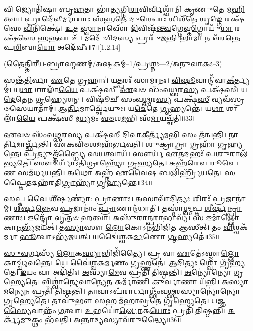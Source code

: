  𑌵𑌿 𑌜𑍍𑌯𑍋𑌤𑌿᳴𑌷𑌾 𑌬𑍃\-\ul{𑌹}\-𑌤𑌾 𑌭𑌾॑\-\ul{𑌤𑍍𑌯}\-𑌗𑍍𑌨𑌿\-\ul{𑌰𑌾}\-𑌵𑌿𑌰𑍍𑌵𑌿𑌶𑍍𑌵𑌾᳴𑌨𑌿 𑌕𑍃𑌣𑍁𑌤𑍇 𑌮\-\ul{𑌹𑌿}\-𑌤𑍍𑌵𑌾। 𑌪𑍍𑌰𑌾𑌦𑍇᳴𑌵𑍀\-\ul{𑌰𑍍𑌮𑌾}\-𑌯𑌾𑌃 𑌸᳴𑌹𑌤𑍇 \ul{𑌦𑍁}\-𑌰𑍇\-\ul{𑌵𑌾𑌃} 𑌶𑌿𑌶𑍀᳴\-\ul{𑌤𑍇} 𑌶𑍃\-\ul{𑌙𑍍𑌗𑍇} 𑌰𑌕𑍍𑌷᳴𑌸𑍇 \ul{𑌵𑌿}\-𑌨𑌿𑌕𑍍𑌷𑍇॑। \ul{𑌉}\-𑌤 \ul{𑌸𑍍𑌵𑌾}\-𑌨𑌾𑌸𑍋᳴ \ul{𑌦𑌿}\-𑌵𑌿𑌷᳴\-\ul{𑌨𑍍𑌤𑍍𑌵}\-𑌗𑍍𑌨𑍇\-\ul{𑌸𑍍𑌤𑌿}\-𑌗𑍍𑌮𑌾𑌯𑍁᳴\-\ul{𑌧𑌾} 𑌰𑌕𑍍𑌷᳴\-\ul{𑌸𑍇} 𑌹\-\ul{𑌨𑍍𑌤}\-𑌵𑌾 𑌉᳴। 𑌮𑌦𑍇᳴ 𑌚𑌿𑌦\-\ul{𑌸𑍍𑌯} 𑌪𑍍𑌰𑌰𑍁᳴𑌜\-\ul{𑌨𑍍𑌤𑌿} 𑌭𑌾\-\ul{𑌮𑌾} 𑌨 𑌵᳴𑌰𑌨𑍍𑌤𑍇 𑌪\-\ul{𑌰𑌿}\-𑌬𑌾\-\ul{𑌧𑍋} 𑌅𑌦𑍇᳴𑌵𑍀𑌃॥7॥[1.2.14]

\centerline{\scriptsize(𑌤𑍈𑌤𑍍𑌤𑌿𑌰𑍀𑌯-𑌬𑍍𑌰𑌾𑌹𑍍𑌮𑌣𑌮𑍍/𑌅𑌷𑍍𑌟𑌕𑌮𑍍–1/𑌪𑍍𑌰𑌶𑍍𑌨𑌃—2/𑌅𑌨𑍁𑌵𑌾𑌕𑌃–3)}

𑌸𑌨𑍍𑌤᳴\-\ul{𑌤𑌿}\-𑌰𑍍𑌵𑌾 \ul{𑌏}\-𑌤𑍇 𑌗𑍍𑌰𑌹𑌾𑌃॑।
𑌯𑌤𑍍𑌪𑌰𑌃᳴ 𑌸𑌾𑌮𑌾𑌨𑌃।
\-\ul{𑌵𑌿}\-\-\ul{𑌷𑍂}\-𑌵𑌾𑌨𑍍𑌦𑌿᳴𑌵𑌾\-\-\ul{𑌕𑍀}\-𑌰𑍍𑌤𑍍𑌯𑌮𑍍॑।
𑌯\-\ul{𑌥𑌾} 𑌶𑌾𑌲𑌾᳴\-\ul{𑌯𑍈} 𑌪𑌕𑍍𑌷᳴𑌸𑍀।
\-\ul{𑌏}\-𑌵𑍞 𑌸𑌂᳴𑌵\-\ul{𑌥𑍍𑌸}\-𑌰\-\ul{𑌸𑍍𑌯} 𑌪𑌕𑍍𑌷᳴𑌸𑍀।
𑌯\-\ul{𑌦𑍇}\-𑌤𑍇𑌨 \ul{𑌗𑍃}\-𑌹𑍍𑌯𑍇𑌰𑌨𑍍।
𑌵𑌿𑌷𑍂᳴𑌚𑍀 𑌸𑌂𑌵\-\ul{𑌥𑍍𑌸}\-𑌰\-\ul{𑌸𑍍𑌯} 𑌪𑌕𑍍𑌷᳴\-\ul{𑌸𑍀} 𑌵𑍍𑌯𑌵᳴𑌸𑍍𑌰𑍞𑌸𑍇𑌯𑌾𑌤𑌾𑌮𑍍।
𑌆\-\ul{𑌰𑍍𑌤𑌿}\-𑌮𑌾𑌰𑍍𑌚𑍍𑌛𑍇᳴𑌯𑍁𑌃।
𑌯\-\ul{𑌦𑍇}\-𑌤𑍇 \ul{𑌗𑍃}\-𑌹𑍍𑌯𑌨𑍍𑌤𑍇॑।
𑌯\-\ul{𑌥𑌾} 𑌶𑌾𑌲𑌾᳴\-\ul{𑌯𑍈} 𑌪𑌕𑍍𑌷᳴𑌸𑍀 𑌮\-\ul{𑌧𑍍𑌯}\-𑌮𑌂 \ul{𑌵}\-\-\ul{𑍞}\-𑌶\-\ul{𑌮}\-𑌭𑌿 𑌸᳴\-\ul{𑌮𑌾}\-𑌯𑌚𑍍𑌛᳴𑌤𑌿॥33॥

\-\ul{𑌏}\-𑌵𑍞 𑌸𑌂᳴𑌵\-\ul{𑌥𑍍𑌸}\-𑌰\-\ul{𑌸𑍍𑌯} 𑌪𑌕𑍍𑌷᳴𑌸𑍀 𑌦𑌿𑌵𑌾\-\ul{𑌕𑍀}\-𑌰𑍍𑌤𑍍𑌯᳴\-\ul{𑌮}\-𑌭𑌿 𑌸𑌂 𑌤᳴𑌨𑍍𑌵𑌨𑍍𑌤𑌿।
𑌨𑌾\-\ul{𑌰𑍍𑌤𑌿}\-𑌮𑌾𑌰𑍍𑌚𑍍𑌛᳴𑌨𑍍𑌤𑌿।
\-\ul{𑌏}\-\-\ul{𑌕}\-\-\ul{𑌵𑌿}\-\-\ul{𑍞}\-𑌶𑌮𑌹᳴𑌰𑍍𑌭𑌵𑌤𑌿।
\-\ul{𑌶𑍁}\-𑌕𑍍𑌰𑌾\-\ul{𑌗𑍍𑌰𑌾} 𑌗𑍍𑌰𑌹𑌾᳴ 𑌗𑍃𑌹𑍍𑌯𑌨𑍍𑌤𑍇।
𑌪𑍍𑌰𑌤𑍍𑌯𑍁𑌤𑍍𑌤᳴𑌬𑍍𑌧𑍍𑌯𑍈 𑌸\-\ul{𑌯}\-𑌤𑍍𑌵𑌾𑌯᳴।
\-\ul{𑌸𑍗}\-𑌰𑍍𑌯᳴ \ul{𑌏}\-𑌤𑌦𑌹𑌃᳴ \ul{𑌪}\-𑌶𑍁𑌰𑌾𑌲᳴𑌭𑍍𑌯𑌤𑍇।
\-\ul{𑌸𑍗}\-𑌰𑍍𑌯𑍋᳴\-𑌽𑌤𑌿\-\ul{𑌗𑍍𑌰𑌾}\-𑌹𑍍𑌯𑍋᳴ 𑌗𑍃𑌹𑍍𑌯𑌤𑍇।
𑌅𑌹᳴\-\ul{𑌰𑍇}\-𑌵 \ul{𑌰𑍂}\-𑌪𑍇\-\ul{𑌣} 𑌸𑌮᳴𑌰𑍍𑌧𑌯𑌨𑍍𑌤𑌿।
𑌅\-\ul{𑌥𑍋} 𑌅𑌹𑍍𑌨᳴ \ul{𑌏}\-𑌵𑍈𑌷 \ul{𑌬}\-𑌲𑌿𑌰𑍍\mbox{}𑌹𑍍𑌰𑌿᳴𑌯𑌤𑍇।
\-\ul{𑌸}\-𑌪𑍍𑌤𑍈𑌤𑌦𑌹᳴𑌰𑌤𑌿\-\ul{𑌗𑍍𑌰𑌾}\-𑌹𑍍𑌯𑌾᳴ 𑌗𑍃𑌹𑍍𑌯𑌨𑍍𑌤𑍇॥34॥

\-\ul{𑌸}\-𑌪𑍍𑌤 𑌵𑍈 𑌶𑍀᳴𑌰𑍍\mbox{}\-\ul{𑌷}\-𑌣𑍍𑌯𑌾॑: \ul{𑌪𑍍𑌰𑌾}\-𑌣𑌾𑌃।
\-\ul{𑌅}\-𑌸𑌾𑌵𑌾᳴\-\ul{𑌦𑌿}\-𑌤𑍍𑌯𑌃 𑌶𑌿𑌰𑌃᳴ \ul{𑌪𑍍𑌰}\-𑌜𑌾𑌨𑌾॑𑌮𑍍।
\-\ul{𑌶𑍀}\-\-\ul{𑌰𑍍}\-𑌷\-\ul{𑌨𑍍𑌨𑍇}\-𑌵 \ul{𑌪𑍍𑌰}\-𑌜𑌾𑌨𑌾𑌂॑ \ul{𑌪𑍍𑌰𑌾}\-𑌣𑌾𑌨𑍍𑌦᳴𑌧𑌾𑌤𑌿।
𑌤𑌸𑍍𑌮𑌾॑\-\ul{𑌥𑍍𑌸}\-𑌪𑍍𑌤 \ul{𑌶𑍀}\-\-\ul{𑌰𑍍}\-𑌷\-\ul{𑌨𑍍𑌪𑍍𑌰𑌾}\-𑌣𑌾𑌃।
𑌇𑌨𑍍𑌦𑍍𑌰𑍋᳴ \ul{𑌵𑍃}\-𑌤𑍍𑌰𑍞 \ul{𑌹}\-𑌤𑍍𑌵𑌾।
𑌅𑌸𑍁᳴𑌰𑌾𑌨𑍍𑌪\-\ul{𑌰𑌾}\-𑌭𑌾𑌵𑍍𑌯᳴।
𑌸 \ul{𑌇}\-𑌮𑌾𑌁\-\ul{𑌲𑍍𑌲𑍋}\-𑌕𑌾\-\ul{𑌨}\-𑌭𑍍𑌯᳴𑌜𑌯𑌤𑍍।
𑌤\-\ul{𑌸𑍍𑌯𑌾}\-𑌸𑍗 \ul{𑌲𑍋}\-𑌕𑍋\-𑌽𑌨᳴𑌭𑌿𑌜𑌿𑌤 𑌆𑌸𑍀𑌤𑍍।
𑌤𑌂 \ul{𑌵𑌿}\-𑌶𑍍𑌵𑌕᳴𑌰𑍍𑌮𑌾 \ul{𑌭𑍂}\-𑌤𑍍𑌵𑌾\-𑌽𑌭𑍍𑌯᳴𑌜𑌯𑌤𑍍।
𑌯𑌦𑍍𑌵𑍈॑𑌶𑍍𑌵𑌕\-\ul{𑌰𑍍𑌮}\-𑌣𑍋 \ul{𑌗𑍃}\-𑌹𑍍𑌯𑌤𑍇॑॥35॥

\-\ul{𑌸𑍁}\-\-\ul{𑌵}\-𑌰𑍍𑌗𑌸𑍍𑌯᳴ \ul{𑌲𑍋}\-𑌕\-\ul{𑌸𑍍𑌯𑌾}\-𑌭𑌿𑌜𑌿᳴𑌤𑍍𑌯𑍈।
𑌪𑍍𑌰 𑌵𑌾 \ul{𑌏}\-𑌤𑍇॑\-𑌽𑌸𑍍𑌮𑌾\-\ul{𑌲𑍍𑌲𑍋}\-𑌕𑌾𑌚𑍍𑌚𑍍𑌯᳴𑌵𑌨𑍍𑌤𑍇।
𑌯𑍇 𑌵𑍈॑𑌶𑍍𑌵𑌕\-\ul{𑌰𑍍𑌮}\-𑌣𑌂 \ul{𑌗𑍃}\-𑌹𑍍𑌣𑌤𑍇॑।
\-\ul{𑌆}\-\-\ul{𑌦𑌿}\-𑌤𑍍𑌯𑌃 𑌶𑍍𑌵𑍋 𑌗𑍃᳴𑌹𑍍𑌯𑌤𑍇।
\-\ul{𑌇}\-𑌯𑌂 𑌵𑌾 𑌅𑌦𑌿᳴𑌤𑌿𑌃।
\-\ul{𑌅}\-𑌸𑍍𑌯𑌾\-\ul{𑌮𑍇}\-𑌵 𑌪𑍍𑌰𑌤𑌿᳴ 𑌤𑌿𑌷𑍍𑌠𑌨𑍍𑌤𑌿।
\-\ul{𑌅}\-𑌨𑍍𑌯𑍋॑𑌨𑍍𑌯𑍋 𑌗𑍃𑌹𑍍𑌯𑍇𑌤𑍇।
𑌵𑌿𑌶𑍍𑌵𑌾॑\-\ul{𑌨𑍍𑌯𑍇}\-𑌵𑌾𑌨𑍍𑌯𑍇\-\ul{𑌨} 𑌕𑌰𑍍𑌮𑌾᳴𑌣𑌿 𑌕𑍁\-\ul{𑌰𑍍𑌵𑌾}\-𑌣𑌾 𑌯᳴𑌨𑍍𑌤𑌿।
\-\ul{𑌅}\-𑌸𑍍𑌯𑌾\-\ul{𑌮}\-𑌨𑍍𑌯𑍇\-\ul{𑌨} 𑌪𑍍𑌰𑌤𑌿᳴ 𑌤𑌿𑌷𑍍𑌠𑌨𑍍𑌤𑌿।
𑌤𑌾𑌵𑌾𑌽𑌪᳴\-\ul{𑌰𑌾}\-𑌰𑍍𑌧𑌾𑌥𑍍𑌸𑌂᳴𑌵\-\ul{𑌥𑍍𑌸}\-𑌰\-\ul{𑌸𑍍𑌯𑌾}\-𑌨𑍍𑌯𑍋॑𑌨𑍍𑌯𑍋 𑌗𑍃𑌹𑍍𑌯𑍇𑌤𑍇।
𑌤𑌾\-\ul{𑌵𑍁}\-𑌭𑍗 \ul{𑌸}\-𑌹 𑌮᳴𑌹𑌾\-\ul{𑌵𑍍𑌰}\-𑌤𑍇 𑌗𑍃᳴𑌹𑍍𑌯𑍇𑌤𑍇।
\-\ul{𑌯}\-𑌜𑍍𑌞\-\ul{𑌸𑍍𑌯𑍈}\-𑌵𑌾𑌨𑍍𑌤𑌂᳴ \ul{𑌗}\-𑌤𑍍𑌵𑌾।
\-\ul{𑌉}\-𑌭𑌯𑍋॑\-\ul{𑌰𑍍𑌲𑍋}\-𑌕\-\ul{𑌯𑍋𑌃} 𑌪𑍍𑌰𑌤𑌿᳴ 𑌤𑌿𑌷𑍍𑌠𑌨𑍍𑌤𑌿।
\-\ul{𑌅}\-𑌰𑍍𑌕𑍍𑌯᳴\-\ul{𑌮𑍁}\-𑌕𑍍𑌥𑌂 𑌭᳴𑌵𑌤𑌿।
\-\ul{𑌅}\-𑌨𑍍𑌨𑌾\-\ul{𑌦𑍍𑌯}\-𑌸𑍍𑌯𑌾𑌵᳴𑌰𑍁𑌦𑍍𑌧𑍍𑌯𑍈॥36॥



